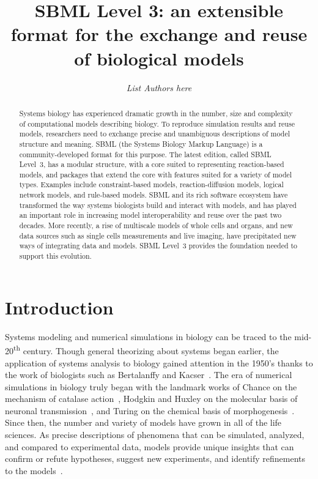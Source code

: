 \documentclass[]{draft-sbml-paper}
\title{SBML Level 3: an extensible format for the exchange and reuse\\of biological models}
\author[1]{\emph{List Authors here}}
\begin{document}
\maketitle

\begin{abstract}
Systems biology has experienced dramatic growth in the number, size and complexity of computational models describing biology. To reproduce simulation results and reuse models, researchers need to exchange precise and unambiguous descriptions of model structure and meaning. SBML (the Systems Biology Markup Language) is a community-developed format for this purpose. The latest edition, called SBML Level~3, has a modular structure, with a core suited to representing reaction-based models, and packages that extend the core with features suited for a variety of model types. Examples include constraint-based models, reaction-diffusion models, logical network models, and rule-based models. SBML and its rich software ecosystem have transformed the way systems biologists build and interact with models, and has played an important role in increasing model interoperability and reuse over the past two decades. More recently, a rise of multiscale models of whole cells and organs, and new data sources such as single cells measurements and live imaging, have precipitated new ways of integrating data and models. SBML Level~3 provides the foundation needed to support this evolution.
\end{abstract}

\clearpage

\section*{Introduction}

Systems modeling and numerical simulations in biology can be traced to the mid-20\textsuperscript{th} century. Though general theorizing about systems began earlier, the application of systems analysis to biology gained attention in the 1950's thanks to the work of biologists such as Bertalanffy and Kacser~\citep{Von_Bertalanffy1950-dy, Von_Bertalanffy1950-wa, Kacser1957-ox, kell2006theodor}. The era of numerical simulations in biology truly began with the landmark works of Chance on the mechanism of catalase action~\citep{chance1952mechanism}, Hodgkin and Huxley on the molecular basis of neuronal transmission~\citep{hodgkin1952quantitative}, and Turing on the chemical basis of morphogenesis~\citep{turing1990chemical}. Since then, the number and variety of models have grown in all of the life sciences. As precise descriptions of phenomena that can be simulated, analyzed, and compared to experimental data, models provide unique insights that can confirm or refute hypotheses, suggest new experiments, and identify refinements to the models~\citep{Heinrich1996, le_novere_2015}.
\end{document}

